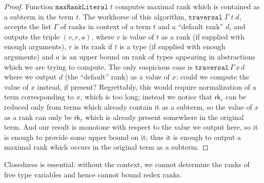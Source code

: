 \documentclass{article}
\theoremstyle{definition}
\theoremstyle{remark}
\begin{document}
\begin{proof}
    Function $\mathtt{maxRankLiteral}\;t$ computes
    maximal rank which is contained as a subterm in the
    term $t$. The workhorse of this algorithm,
    $\mathtt{traversal}\;\Gamma\;t\;d$, accepts the
    list $\Gamma$ of ranks in context of a term $t$ and
    a ``default rank'' $d$, and outputs the triple
    $(v,r,a)$, where $v$ is value of $t$ as a rank (if
    supplied with enough arguments), $r$ is its rank if
    $t$ is a type (if supplied with enough arguments)
    and $a$ is an upper bound on rank of types
    appearing in abstractions which we are trying to
    compute. The only suspicious case is
    $\mathtt{traversal}\,\Gamma\,x\,d$ where we output
    $d$ (the ``default'' rank) as a value of $x$:
    could we compute the value of $x$ instead, if
    present? Regrettably, this would require
    normalization of a term corresponding to $x$, which
    is too long; instead we notice that $\mathsf{rk}_r$
    can be reduced only from terms which already
    contain it as a subterm, so the value of $x$ as a
    rank can only be $\mathsf{rk}_r$ which is already
    present somewhere in the original term. And our
    result is monotone with respect to the value we
    output here, so it is enough to provide some upper
    bound on it; thus it is enough to output a maximal
    rank which occurs in the original term as a
    subterm.
\end{proof}

Closedness is essential: without the context, we cannot
determine the ranks of free type variables and hence
cannot bound redex ranks.
\end{document}
